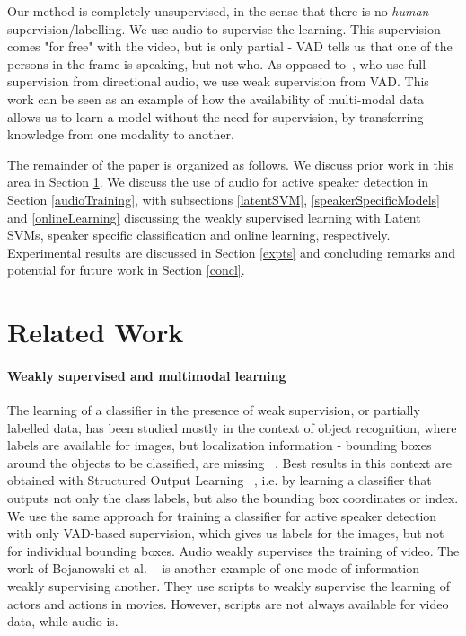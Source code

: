 \documentclass[runningheads]{llncs}
\begin{document}

Our method is completely unsupervised, in the sense that there is no \emph{human} supervision/labelling. We use audio to supervise the learning. This supervision comes "for free" with the video, but is only partial - VAD tells us that one of the persons in the frame is speaking, but not who. As opposed to~\cite{Chakravarty15}, who use full supervision from directional audio, we use weak supervision from VAD.
This work can be seen as an example of how the availability of multi-modal data allows us to learn a model without the need for supervision, by transferring knowledge from one modality to another.

The remainder of the paper is organized as follows.
We discuss prior work in this area in Section \ref{relWork}. We discuss the use of audio for active speaker detection in Section \ref{audioTraining}, with subsections \ref{latentSVM}, \ref{speakerSpecificModels} and \ref{onlineLearning} discussing the weakly supervised learning with Latent SVMs, speaker specific classification and online learning, respectively. Experimental results are discussed in  Section \ref{expts} and concluding remarks and potential for future work in Section \ref{concl}.

\section{Related Work}
\label{relWork}

\paragraph{Weakly supervised and multimodal learning} 
The learning of a classifier in the presence of weak supervision, or partially labelled data, has been studied mostly in the context of object recognition, where labels are available for images, but localization information - bounding boxes around the objects to be classified, are missing ~\cite{Bilen14a,Bilen14,Bilen15,Deselaers12,Song14}. 
%
Best results in this context are obtained with Structured Output Learning ~\cite{Nguyen09}, i.e. by learning a classifier that outputs not only the class labels, but also the bounding box coordinates or index.%
%
We use the same approach for training a classifier for active speaker detection with only VAD-based supervision, which gives us labels for the images, but not for individual bounding boxes. Audio weakly supervises the training of video.
The work of Bojanowski et al. ~\cite{Bojanowski13} is another example of one mode of information weakly supervising another. They use scripts to weakly supervise the learning of actors and actions in movies. 
However, scripts are not always available for video data, while audio is.
\end{document}
